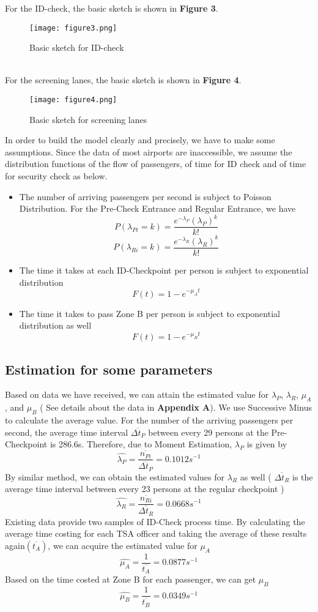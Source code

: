 \documentclass{mcmthesis}
\begin{document}
For the ID-check, the basic sketch is shown in \textbf{Figure 3}.
\begin{figure}[h]
\small
\centering
\texttt{[image: figure3.png]}
\caption{Basic sketch for ID-check} \label{fig:Basic sketch for ID-check}
\end{figure}\\
For the screening lanes, the basic sketch is shown in \textbf{Figure 4}.

\begin{figure}[h]
\small
\centering
\texttt{[image: figure4.png]}
\caption{Basic sketch for screening lanes} \label{fig:Basic sketch for screening lanes}
\end{figure}
In order to build the model clearly and precisely, we have to make some assumptions. Since the data of most airports are inaccessible, we assume the distribution functions of the flow of passengers, of time for ID check and of time for security check as below.
\begin{itemize}
\item The number of arriving passengers per second is subject to Poisson Distribution. For the Pre-Check Entrance and Regular Entrance, we have
$$P(\lambda_{Pi}=k)=\frac{e^{-\lambda_P}(\lambda_P)^k}{k!}$$
$$P(\lambda_{Ri}=k)=\frac{e^{-\lambda_R}(\lambda_R)^k}{k!}$$
\item The time it takes at each ID-Checkpoint per person is subject to exponential distribution
$$F(t)=1-e^{-\mu_At}$$
\item The time it takes to pass Zone B per person is subject to exponential distribution as well
$$F(t)=1-e^{-\mu_Bt}$$
\end{itemize}
\subsection{Estimation for some parameters}
Based on data we have received, we can attain the estimated value for $\lambda_P$, $\lambda_R$, $\mu_A$, and $\mu_B$ ( See details about the data in \textbf{Appendix A}). We use Successive Minus to calculate the average value. For the number of the arriving passengers per second, the average time interval $\overline{\Delta t_P}$ between every 29 persons at the Pre-Checkpoint is 286.6s. Therefore, due to Moment Estimation, $\lambda_P$ is given by
$$\widehat{\lambda_P}=\frac{\overline{n_{Pi}}}{\overline{\Delta t_P}}=0.1012s^{-1}$$
By similar method, we can obtain the estimated values for $\lambda_R$ as well ( $\overline{\Delta t_R}$ is the average time interval between every 23 persons at the regular checkpoint )
$$\widehat{\lambda_R}=\frac{\overline{n_{Ri}}}{\overline{\Delta t_R}}=0.0668s^{-1}$$
Existing data provide two samples of ID-Check process time. By calculating the average time costing for each TSA officer and taking the average of these results again$(\overline{t_A})$, we can acquire the estimated value for $\mu_A$
$$\widehat{\mu_A}=\frac{1}{\overline{t_A}}=0.0877s^{-1}$$
Based on the time costed at Zone B for each passenger, we can get $\mu_B$
$$\widehat{\mu_B}=\frac{1}{\overline{t_B}}=0.0349s^{-1}$$
\end{document}
